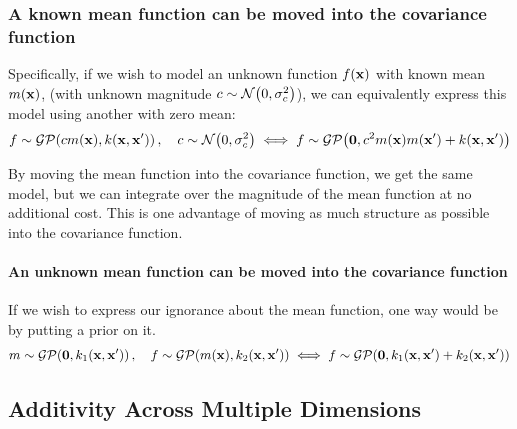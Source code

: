 


\subsubsection{A known mean function can be moved into the covariance function}
Specifically, if we wish to model an unknown function $f({\bf{x}})$ with known mean $m({\bf{x}})$, (with unknown magnitude $c \sim \mathcal{N}\!\left(0,\sigma^2_c\right)$), we can equivalently express this model using another \gp{} with zero mean:
%
\begin{align}
f \sim \mathcal{GP}\!\left(c m({\bf{x}}),k({\bf{x}},{\bf{x}}')\right), \quad c \sim \mathcal{N}\!\left(0,\sigma^2_c\right)
\iff f \sim \mathcal{GP}\!\left( {\bf{0}} , c^2 m({\bf{x}}) m({\bf{x}}') + k({\bf{x}},{\bf{x}}')\right)
\end{align}


By moving the mean function into the covariance function, we get the same model, but we can integrate over the magnitude of the mean function at no additional cost.
This is one advantage of moving as much structure as possible into the covariance function.

\paragraph{An unknown mean function can be moved into the covariance function}

If we wish to express our ignorance about the mean function, one way would be by putting a \gp{} prior on it.
%
\begin{align}
m \sim \mathcal{GP}\!\left({\bf{0}},k_1({\bf{x}},{\bf{x}}')\right), \quad
f \sim \mathcal{GP}\!\left(m({\bf{x}}),k_2({\bf{x}},{\bf{x}}')\right)
\iff 
f \sim \mathcal{GP}\!\left({\bf{0}},k_1({\bf{x}},{\bf{x}}') + k_2({\bf{x}},{\bf{x}}')\right)
\end{align}



\subsection{Additivity Across Multiple Dimensions}

